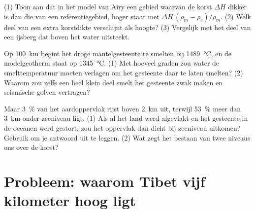 \begin{exercise}[$\star\star\star$]\label{exo:g11:lithosphere-asthenosphere:13}
(1) Toon aan dat in het model van Airy een gebied waarvan de korst $\Delta H$
dikker is dan die van een referentiegebied, hoger staat met $\Delta H\,(\rho_m - \rho_c)/\rho_m$.
(2) Welk deel van een extra korstdikte verschijnt als hoogte? (3)
Vergelijk met het deel van een ijsberg dat boven het water uitsteekt.
\end{exercise}

\begin{exercise}[$\star\star\star$]\label{exo:g11:lithosphere-asthenosphere:14}
Op \qty{100}{km} begint het droge mantelgesteente te smelten bij
\qty{1489}{\celsius}, en de modelgeotherm staat op \qty{1345}{\celsius}. (1)
Met hoeveel graden zou water de smelttemperatuur moeten verlagen om het gesteente
daar te laten smelten? (2) Waarom zou zelfs een heel klein deel smelt het
gesteente zwak maken en seismische golven vertragen?
\end{exercise}

\begin{exercise}[$\star\star\star$]\label{exo:g11:lithosphere-asthenosphere:15}
Maar \qty{3}{\percent} van het aardoppervlak rijst boven \qty{2}{km} uit,
terwijl \qty{53}{\percent} meer dan \qty{3}{km} onder zeeniveau ligt. (1) Als al
het land werd afgevlakt en het gesteente in de oceanen werd gestort, zou het
oppervlak dan dicht bij zeeniveau uitkomen? Gebruik  om je antwoord uit
te leggen. (2) Wat zegt het bestaan van twee niveaus ons over de korst?
\end{exercise}

\section{Probleem: waarom Tibet vijf kilometer hoog ligt}

